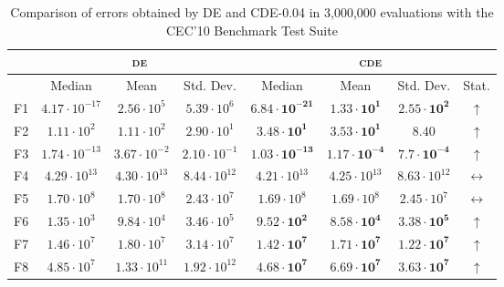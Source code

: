 \begin{table}[!t]
\caption{Comparison of errors obtained by \textsc{DE} and \textsc{CDE}-0.04 in 3,000,000 evaluations with the CEC'10 Benchmark Test Suite}
\label{tab:scalability_1000_cec}
\centering
\begin{scriptsize}
\begin{tabular}{c || c c c | c c c c}
\hline
 & \multicolumn{3}{|c|}{\textsc{de}} & \multicolumn{4}{|c}{\textsc{cde}} \\ \hline
    & Median                 & Mean                  & Std. Dev.             & Median                         & Mean                           & Std. Dev.                      & Stat.               \\ \hline
F1  & $4.17 \cdot 10^{-17}$ & $2.56  \cdot 10^{5}$  & $5.39 \cdot 10^{6}$  & $\mathbf{6.84 \cdot 10^{-21}}$ & $\mathbf{1.33 \cdot 10^{1}}$  & $\mathbf{2.55 \cdot 10^{2}}$ & $\uparrow$ \\ \hline
F2  & $1.11 \cdot 10^{2}$   & $1.11  \cdot 10^{2}$  & $2.90 \cdot 10^{1}$  & $\mathbf{3.48 \cdot 10^{1}}$   & $\mathbf{3.53 \cdot 10^{1}}$  & $\mathbf{8.40}$ & $\uparrow$ \\ \hline
F3  & $1.74 \cdot 10^{-13}$ & $3.67  \cdot 10^{-2}$ & $2.10 \cdot 10^{-1}$ & $\mathbf{1.03 \cdot 10^{-13}}$ & $\mathbf{1.17 \cdot 10^{-4}}$ & $\mathbf{7.7 \cdot 10^{-4}}$ & $\uparrow$ \\ \hline
F4  & $4.29 \cdot 10^{13}$  & $4.30  \cdot 10^{13}$ & $8.44 \cdot 10^{12}$ & $4.21 \cdot 10^{13}$  & $4.25 \cdot 10^{13}$ & $8.63 \cdot 10^{12}$ & $\leftrightarrow$ \\ \hline
F5  & $1.70 \cdot 10^{8}$   & $1.70  \cdot 10^{8}$  & $2.43 \cdot 10^{7}$  & $1.69 \cdot 10^{8}$   & $1.69 \cdot 10^{8}$  & $2.45 \cdot 10^{7}$ & $\leftrightarrow$ \\ \hline
F6  & $1.35 \cdot 10^{3}$   & $9.84  \cdot 10^{4}$  & $3.46 \cdot 10^{5}$  & $\mathbf{9.52 \cdot 10^{2}}$   & $\mathbf{8.58 \cdot 10^{4}}$  & $\mathbf{3.38 \cdot 10^{5}}$ & $\uparrow$ \\ \hline
F7  & $1.46 \cdot 10^{7}$   & $1.80  \cdot 10^{7}$  & $3.14 \cdot 10^{7}$  & $\mathbf{1.42 \cdot 10^{7}}$   & $\mathbf{1.71 \cdot 10^{7}}$  & $\mathbf{1.22 \cdot 10^{7}}$ & $\uparrow$ \\ \hline
F8  & $4.85 \cdot 10^{7}$   & $1.33  \cdot 10^{11}$ & $1.92 \cdot 10^{12}$ & $\mathbf{4.68 \cdot 10^{7}}$   & $\mathbf{6.69 \cdot 10^{7}}$  & $\mathbf{3.63 \cdot 10^{7}}$ & $\uparrow$ \\ \hline

\end{tabular}
\end{scriptsize}
\end{table}
